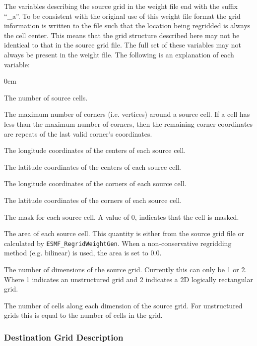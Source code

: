 The variables describing the source grid in the weight file end with the suffix ``\_a''. To be consistent with the original use of this weight file format 
the grid information is written to the file such that the location being regridded is always the cell center. This means that the grid structure described here may not be identical to that in the source grid file. The full set of these variables may not always be present in the weight file. The following is an 
explanation of each variable:
\begin{description}
  \itemsep0em
  \item[n\_a] The number of source cells. 
  \item[nv\_a] The maximum number of corners (i.e. vertices)  around a source cell. If a cell has less than the maximum number of corners, then the remaining corner coordinates are repeats of the last valid corner's coordinates.    
  \item[xc\_a] The longitude coordinates of the centers of each source cell.  
  \item[yc\_a] The latitude coordinates of the centers of each source cell.  
  \item[xv\_a] The longitude coordinates of the corners of each source cell.  
  \item[yv\_a] The latitude coordinates of the corners of each source cell.  
  \item[mask\_a] The mask for each source cell. A value of 0, indicates that the cell is masked. 
  \item[area\_a] The area of each source cell. This quantity is either from the source grid file or calculated by {\tt ESMF\_RegridWeightGen}. When a non-conservative regridding method (e.g. bilinear) is used, the area is set to 0.0. 
  \item[src\_grid\_rank] The number of dimensions of the source grid. Currently this can only be 1 or 2. Where 1 indicates an unstructured grid and 2 indicates a 2D logically rectangular grid.
  \item[src\_grid\_dims] The number of cells along each dimension of the source grid. For unstructured grids this is equal to the number of cells in the grid. 
\end{description}

\subsubsection{Destination Grid Description}


